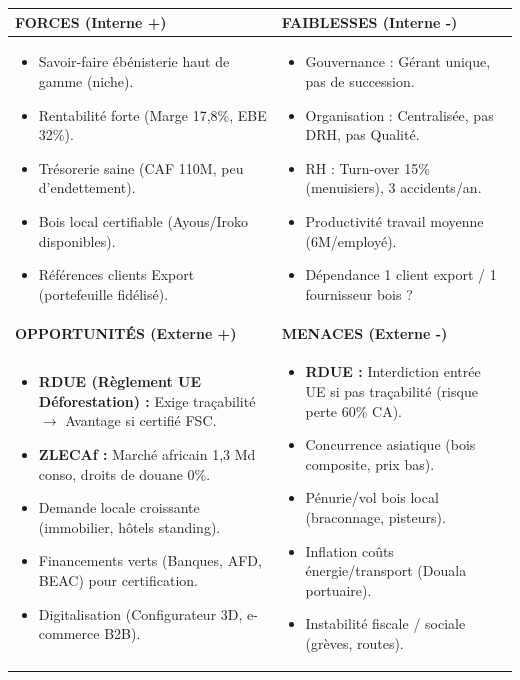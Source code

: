 \documentclass[11pt]{article}
\begin{document}
\begin{exemplebox}
\begin{center}
\begin{tabularx}{\linewidth}{|X|X|}\hline
\rowcolor{popblueL} \textbf{FORCES (Interne +)} & \textbf{FAIBLESSES (Interne -)} \\ \hline
\begin{itemize}
    \item Savoir-faire ébénisterie haut de gamme (niche).
    \item Rentabilité forte (Marge 17,8\%, EBE 32\%).
    \item Trésorerie saine (CAF 110M, peu d'endettement).
    \item Bois local certifiable (Ayous/Iroko disponibles).
    \item Références clients Export (portefeuille fidélisé).
\end{itemize} & \begin{itemize}
    \item Gouvernance : Gérant unique, pas de succession.
    \item Organisation : Centralisée, pas DRH, pas Qualité.
    \item RH : Turn-over 15\% (menuisiers), 3 accidents/an.
    \item Productivité travail moyenne (6M/employé).
    \item Dépendance 1 client export / 1 fournisseur bois ?
\end{itemize} \\ \hline
\rowcolor{popgreenL} \textbf{OPPORTUNITÉS (Externe +)} & \textbf{MENACES (Externe -)} \\ \hline
\begin{itemize}
    \item \textbf{RDUE (Règlement UE Déforestation) :} Exige traçabilité $\rightarrow$ Avantage si certifié FSC.
    \item \textbf{ZLECAf :} Marché africain 1,3 Md conso, droits de douane 0\%.
    \item Demande locale croissante (immobilier, hôtels standing).
    \item Financements verts (Banques, AFD, BEAC) pour certification.
    \item Digitalisation (Configurateur 3D, e-commerce B2B).
\end{itemize} & \begin{itemize}
    \item \textbf{RDUE :} Interdiction entrée UE si pas traçabilité (risque perte 60\% CA).
    \item Concurrence asiatique (bois composite, prix bas).
    \item Pénurie/vol bois local (braconnage, pisteurs).
    \item Inflation coûts énergie/transport (Douala portuaire).
    \item Instabilité fiscale / sociale (grèves, routes).
\end{itemize} \\ \hline
\end{tabularx}
\end{center}
\end{exemplebox}
\end{document}

